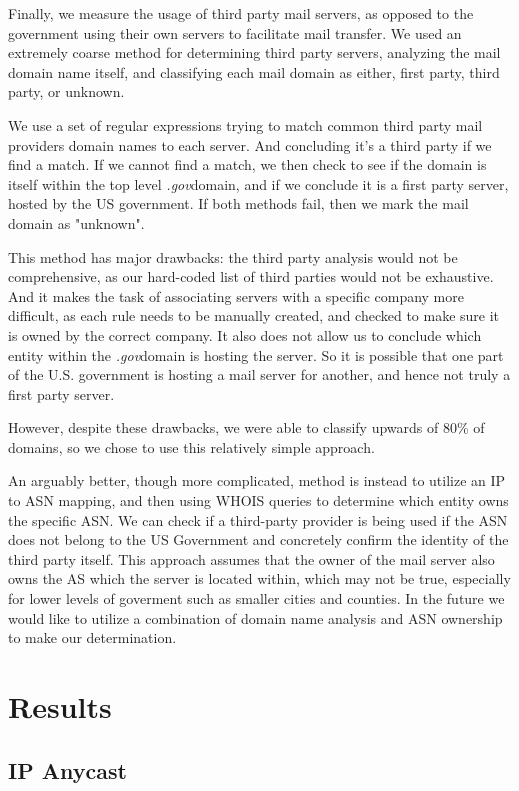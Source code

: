 \documentclass{hotnets21}
\newcommand{\dotgov}{\textit{.gov}\space}
\begin{document}
Finally, we measure the usage of third party mail servers, as opposed to the government using their own servers to facilitate mail transfer.
We used an extremely coarse method for determining third party servers, analyzing the mail domain name itself, and classifying each mail domain as either, first party, third party, or unknown.

We use a set of regular expressions trying to match common third party mail providers domain names to each server.
And concluding it's a third party if we find a match.
If we cannot find a match, we then check to see if the domain is itself within the top level \dotgov domain, and if we conclude it is a first party server, hosted by the US government.
If both methods fail, then we mark the mail domain as "unknown".

This method has major drawbacks: the third party analysis would not be comprehensive, as our hard-coded list of third parties would not be exhaustive.
And it makes the task of associating servers with a specific company more difficult, as each rule needs to be manually created, and checked to make sure it is owned by the correct company.
It also does not allow us to conclude which entity within the \dotgov domain is hosting the server. So it is possible that one part of the U.S. government is hosting a mail server for another, and hence not truly a first party server.

However, despite these drawbacks, we were able to classify upwards of 80\% of domains, so we chose to use this relatively simple approach.

An arguably better, though more complicated, method is instead to utilize an IP to ASN mapping, and then using WHOIS queries to determine which entity owns the specific ASN.
We can check if a third-party provider is being used if the ASN does not belong to the US Government and concretely confirm the identity of the third party itself.
This approach assumes that the owner of the mail server also owns the AS which the server is located within, which may not be true, especially for lower levels of goverment such as smaller cities and counties.
In the future we would like to utilize a combination of domain name analysis and ASN ownership to make our determination.

\section{Results}

\subsection{IP Anycast}
\end{document}
